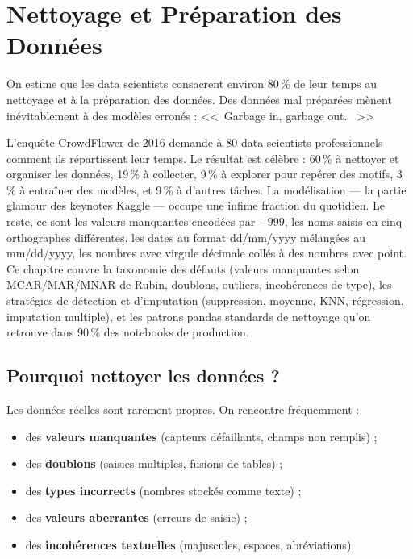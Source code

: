 \chapter{Nettoyage et Pr\'eparation des Donn\'ees}
\label{ch:nettoyage}

\begin{intuition}
On estime que les data scientists consacrent environ 80\,\% de leur temps au nettoyage et \`a la pr\'eparation des donn\'ees. Des donn\'ees mal pr\'epar\'ees m\`enent in\'evitablement \`a des mod\`eles erron\'es : <<~Garbage in, garbage out. ~>>
\end{intuition}

L'enquête CrowdFlower de 2016 demande à 80 data scientists professionnels comment ils répartissent leur temps. Le résultat est célèbre : 60\,\% à nettoyer et organiser les données, 19\,\% à collecter, 9\,\% à explorer pour repérer des motifs, 3\,\% à entraîner des modèles, et 9\,\% à d'autres tâches. La modélisation --- la partie glamour des keynotes Kaggle --- occupe une infime fraction du quotidien. Le reste, ce sont les valeurs manquantes encodées par $-999$, les noms saisis en cinq orthographes différentes, les dates au format dd/mm/yyyy mélangées au mm/dd/yyyy, les nombres avec virgule décimale collés à des nombres avec point. Ce chapitre couvre la taxonomie des défauts (valeurs manquantes selon MCAR/MAR/MNAR de Rubin, doublons, outliers, incohérences de type), les stratégies de détection et d'imputation (suppression, moyenne, KNN, régression, imputation multiple), et les patrons pandas standards de nettoyage qu'on retrouve dans 90\,\% des notebooks de production.

\section{Pourquoi nettoyer les donn\'ees ?}

Les donn\'ees r\'eelles sont rarement propres. On rencontre fr\'equemment :
\begin{itemize}
    \item des \textbf{valeurs manquantes} (capteurs d\'efaillants, champs non remplis) ;
    \item des \textbf{doublons} (saisies multiples, fusions de tables) ;
    \item des \textbf{types incorrects} (nombres stock\'es comme texte) ;
    \item des \textbf{valeurs aberrantes} (erreurs de saisie) ;
    \item des \textbf{incoh\'erences textuelles} (majuscules, espaces, abr\'eviations).
\end{itemize}

